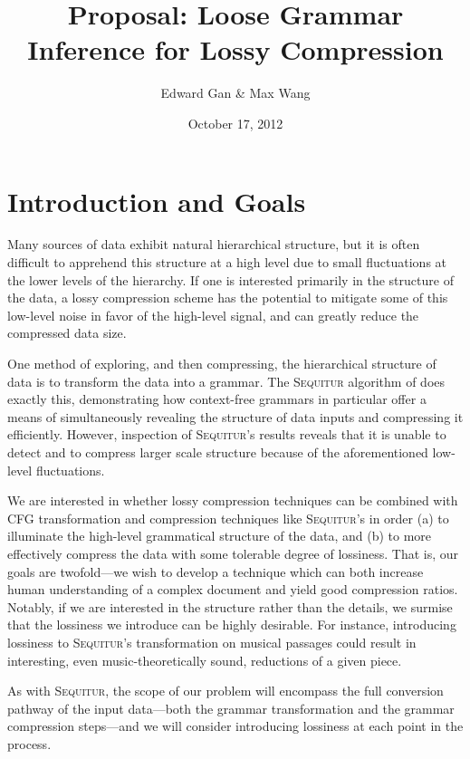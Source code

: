 \documentclass[11pt]{article}
\newcommand{\Sequitur}{\textsc{Sequitur}\xspace}
\begin{document}


\title{Proposal: Loose Grammar Inference for Lossy Compression}
\author{Edward Gan \& Max Wang}
\date{October 17, 2012}
\maketitle

\section{Introduction and Goals}

Many sources of data exhibit natural hierarchical structure, but it is
often difficult to apprehend this structure at a high level due to small
fluctuations at the lower levels of the hierarchy.  If one is
interested primarily in the structure of the data, a lossy compression scheme
has the potential to mitigate some of this low-level noise in favor of the
high-level signal, and can greatly reduce the compressed data size.

One method of exploring, and then compressing, the hierarchical structure of
data is to transform the data into a grammar.  The \Sequitur algorithm of
\cite{sequitur} does exactly this, demonstrating how context-free grammars in
particular offer a means of simultaneously revealing the structure of data
inputs and compressing it efficiently.  However, inspection of \Sequitur's
results reveals that it is unable to detect and to compress larger scale
structure because of the aforementioned low-level fluctuations.

We are interested in whether lossy compression techniques can be combined with
CFG transformation and compression techniques like \Sequitur's in order (a) to
illuminate the high-level grammatical structure of the data, and (b) to more
effectively compress the data with some tolerable degree of lossiness.  That
is, our goals are twofold---we wish to develop a technique which can both
increase human understanding of a complex document and yield good compression
ratios.  Notably, if we are interested in the structure rather than the
details, we surmise that the lossiness we introduce can be highly desirable.
For instance, introducing lossiness to \Sequitur's transformation on musical
passages could result in interesting, even music-theoretically sound, 
reductions of a given piece.

As with \Sequitur, the scope of our problem will encompass the full conversion
pathway of the input data---both the grammar transformation and the grammar
compression steps---and we will consider introducing lossiness at each point in
the process.
\end{document}
